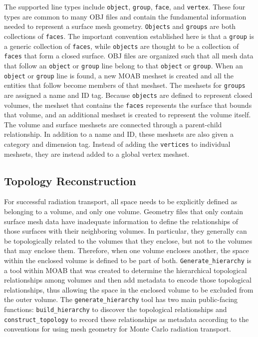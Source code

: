 \documentclass{anstrans}
\begin{document}
The supported line types include \texttt{object}, \texttt{group},
\texttt{face}, and \texttt{vertex}.  These four types are common to many OBJ
files and contain the fundamental information needed to represent a surface
mesh geometry.  \texttt{Objects} and \texttt{groups} are both collections of
\texttt{faces}.  The important convention established here is that a
\texttt{group} is a generic collection of \texttt{faces}, while
\texttt{objects} are thought to be a collection of \texttt{faces} that form a
closed surface.  OBJ files are organized such that all mesh data that follow
an \texttt{object} or \texttt{group} line belong to that \texttt{object} or
\texttt{group}.  When an \texttt{object} or \texttt{group} line is found, a
new MOAB meshset is created and all the entities that follow become members of
that meshset.  The meshsets for \texttt{groups} are assigned a name and
ID tag.  Because \texttt{objects} are defined to represent closed volumes, the
meshset that contains the \texttt{faces} represents the surface that bounds
that volume, and an additional meshset is created to represent the volume
itself.  The volume and surface meshsets are connected through a parent-child
relationship.  In addition to a name and ID, these meshsets are also given a
category and dimension tag.  Instead of adding the \texttt{vertices} to individual
meshsets, they are instead added to a global vertex meshset.

\subsection{Topology Reconstruction}
For successful radiation transport, all space needs to be explicitly defined
as belonging to a volume, and only one volume.  Geometry files that only
contain surface mesh data have inadequate information to define the
relationships of those surfaces with their neighboring volumes.  In
particular, they generally can be topologically related to the volumes that
they enclose, but not to the volumes that may enclose them.  Therefore, when
one volume encloses another, the space within the enclosed volume is defined
to be part of both. \texttt{Generate\_hierarchy} is a tool within MOAB
\cite{genhi} that was created to determine the hierarchical topological
relationships among volumes and then add metadata to encode those topological
relationships, thus allowing the space in the enclosed volume to be excluded
from the outer volume.  The \texttt{generate\_hierarchy} tool has two main
public-facing functions: \texttt{build\_hierarchy} to discover the topological
relationships and \texttt{construct\_topology} to record these relationships as
metadata according to the conventions for using mesh geometry for Monte
Carlo radiation transport.
\end{document}

